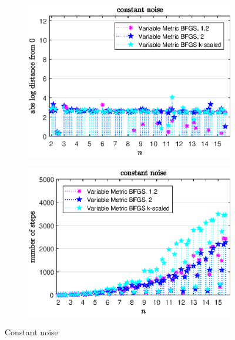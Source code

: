 \begin{figure}[H]
	\begin{subfigure}{0.49\textwidth}
		\includegraphics[width=\textwidth]{Pictures/Plots/constant_noise_comp.eps}%
	\end{subfigure}
	\begin{subfigure}{0.49\textwidth}
		\includegraphics[width=\textwidth]{Pictures/Plots/steps_constant_noise_comp.eps}%
	\end{subfigure}
	\caption{Constant noise}%
	\label{fig_const_noise_comp}%
\end{figure}

